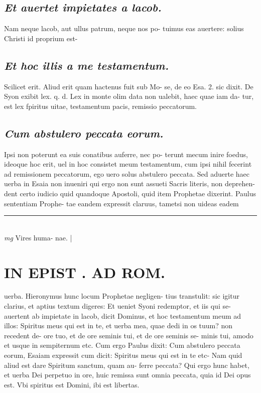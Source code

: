 \documentclass{article}
\begin{document}
\begin{pages}
\subsection*{\textit{Et auertet impietates a lacob. }}\pstart Nam neque lacob, aut ullus patrum, neque nos po- tuimus eas auertere: solius Christi id proprium est-  \pend
{}
{}
\subsection*{\textit{Et hoc illis a me testamentum. }}\pstart Scilicet erit. Aliud erit quam hactenus fuit sub Mo- se, de eo Esa. 2. sic dixit. De Syon exibit lex. q. d.  Lex in monte olim data non ualebit, haec quae iam da- tur, est lex fpiritus uitae, testamentum pacis, remissio peccatorum.   \pend
{}
{}
\subsection*{\textit{Cum abstulero peccata eorum. }}\pstart Ipsi non poterunt ea suis conatibus auferre, nec po- terunt mecum inire foedus, ideoque hoc erit, uel in hoc consistet meum testamentum, cum ipsi nihil fecerint ad remissionem peccatorum, ego uero solus abstulero peccata. Sed aduerte haec uerba in Esaia non inueniri qui ergo non sunt assueti Sacris literis, non deprehen- dent certo iudicio quid quandoque Apostoli, quid item Prophetae dixerint. Paulus sententiam Prophe- tae eandem expressit claruus, tametsi non uideas eadem  \pend
\vspace{0.5cm}\noindent
\vspace{0.2cm}\rule{1cm}{0.2pt}\\ 
\hspace{0.2cm}\textit{mg}
\footnotesize Vires huma- nae. 
\normalsize| 
\section*{IN EPIST . AD ROM.  }
\marginpar{[ p.134 ]}\pstart uerba. Hieronymus hunc locum Prophetae negligen- tius transtulit: sic igitur clarius, et aptius textum digeres: Et ueniet Syoni redemptor, et iis qui se- auertent ab impietate in lacob, dicit Dominus, et hoc testamentum meum ad illos: Spiritus meus qui est in te, et uerba mea, quae dedi in os tuum? non recedent de- ore tuo, et de ore seminis tui, et de ore seminis se- minis tui, amodo et usque in sempiternum etc. Cum ergo Paulus dixit: Cum abstulero peccata eorum, Esaiam expressit cum dicit: Spiritus meus qui est in te etc- Nam quid aliud est dare Spiritum sanctum, quam au- ferre peccata? Qui ergo hunc habet, et uerba Dei perpetuo in ore, huic remissa sunt omnia peccata, quia id Dei opus est. Vbi spiritus est Domini, ibi est libertas.   \pend
{}
{}

\end{pages}
\end{document}
